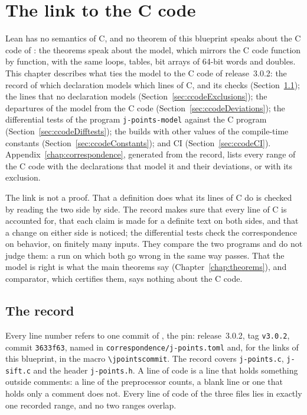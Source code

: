 \chapter{The link to the C code}\label{chap:ccode}

Lean has no semantics of C, and no theorem of this blueprint speaks about the C code of \jpoints{}:
the theorems speak about the model, which mirrors the C code function by function, with the same
loops, tables, bit arrays of 64-bit words and doubles. This chapter describes what ties the model to
the C code of release~3.0.2: the record of which declaration models which lines of C, and its checks
(Section~\ref{sec:ccodeRecord}); the lines that no declaration models
(Section~\ref{sec:ccodeExclusions}); the departures of the model from the C code
(Section~\ref{sec:ccodeDeviations}); the differential tests of the program \verb|j-points-model|
against the C program (Section~\ref{sec:ccodeDifftests}); the builds with other values of the
compile-time constants (Section~\ref{sec:ccodeConstants}); and CI (Section~\ref{sec:ccodeCI}).
Appendix~\ref{chap:correspondence}, generated from the record, lists every range of the C code with
the declarations that model it and their deviations, or with its exclusion.

The link is not a proof. That a definition does what its lines of C do is checked by reading the two
side by side. The record makes sure that every line of C is accounted for, that each claim is made
for a definite text on both sides, and that a change on either side is noticed; the differential
tests check the correspondence on behavior, on finitely many inputs. They compare the two programs
and do not judge them: a run on which both go wrong in the same way passes. That the model is right
is what the main theorems say (Chapter~\ref{chap:theorems}), and comparator, which certifies them,
says nothing about the C code.

\section{The record}\label{sec:ccodeRecord}

Every line number refers to one commit of \jpoints{}, the pin: release~3.0.2, tag \verb|v3.0.2|,
commit \verb|3633f63|, named in \verb|correspondence/j-points.toml| and, for the links of this
blueprint, in the macro \verb|\jpointscommit|. The record covers \verb|j-points.c|, \verb|j-sift.c|
and the header \verb|j-points.h|. A line of code is a line that holds something outside comments: a
line of the preprocessor counts, a blank line or one that holds only a comment does not. Every line
of code of the three files lies in exactly one recorded range, and no two ranges overlap.

